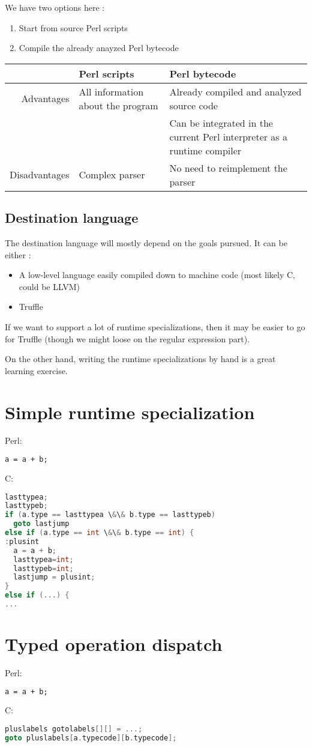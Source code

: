 \documentclass[11pt,a4paper]{report}
\newcommand{\pgl}[1]{\textsf{#1}}
\begin{document}
We have two options here :
\begin{enumerate}
\item Start from source Perl scripts
\item Compile the already anayzed Perl bytecode
\end{enumerate}

\begin{tabular}{|r|l|l|}
\hline
	& Perl scripts	& Perl bytecode \\
\hline
Advantages	& All information about the program	& Already compiled and analyzed source code \\
	&	& Can be integrated in the current Perl interpreter as a runtime compiler \\
\hline
Disadvantages	& Complex parser	& No need to reimplement the parser \\
\hline
\end{tabular}

\subsection{Destination language}

The destination language will mostly depend on the goals pursued. It can be either :
\begin{itemize}
\item A low-level language easily compiled down to machine code (most likely \pgl{C}, could be \pgl{LLVM})
\item Truffle
\end{itemize}

If we want to support a lot of runtime specializations, then it may be easier to go for Truffle (though we might loose on the regular expression part).

On the other hand, writing the runtime specializations by hand is a great learning exercise.

\section{Simple runtime specialization}


Perl:
\begin{lstlisting}[language=perl]
a = a + b;
\end{lstlisting}

C:
\begin{lstlisting}[language=C]
lasttypea;
lasttypeb;
if (a.type == lasttypea \&\& b.type == lasttypeb)
  goto lastjump
else if (a.type == int \&\& b.type == int) {
:plusint
  a = a + b;
  lasttypea=int;
  lasttypeb=int;
  lastjump = plusint;
}
else if (...) {	
...
\end{lstlisting}

\section{Typed operation dispatch}


Perl:
\begin{lstlisting}[language=perl]
a = a + b;
\end{lstlisting}

C:
\begin{lstlisting}[language=C]
pluslabels gotolabels[][] = ...;
goto pluslabels[a.typecode][b.typecode];
\end{lstlisting}
\end{document}
